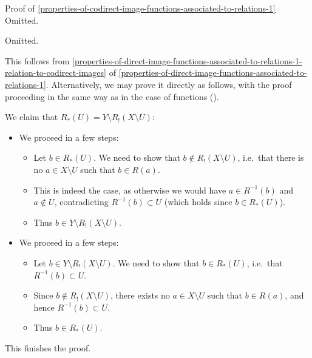 \begin{Proof}{Proof of \cref{properties-of-codirect-image-functions-associated-to-relations-1}}
    Omitted.

    Omitted.

    This follows from \cref{properties-of-direct-image-functions-associated-to-relations-1-relation-to-codirect-images} of \cref{properties-of-direct-image-functions-associated-to-relations-1}. Alternatively, we may prove it directly as follows, with the proof proceeding in the same way as in the case of functions ().

    We claim that $R_{*}(U)=Y\setminus R_{!}(X\setminus U)$:
    \begin{itemize}
        \item{}We proceed in a few steps:
            \begin{itemize}
                \item Let $b\in R_{*}(U)$. We need to show that $b\nin R_{!}(X\setminus U)$, i.e.\ that there is no $a\in X\setminus U$ such that $b\in R(a)$.
                \item This is indeed the case, as otherwise we would have $a\in R^{-1}(b)$ and $a\nin U$, contradicting $R^{-1}(b)\subset U$ (which holds since $b\in R_{*}(U)$).
                \item Thus $b\in Y\setminus R_{!}(X\setminus U)$.
            \end{itemize}
        \item{}We proceed in a few steps:
            \begin{itemize}
                \item Let $b\in Y\setminus R_{!}(X\setminus U)$. We need to show that $b\in R_{*}(U)$, i.e.\ that $R^{-1}(b)\subset U$.
                \item Since $b\nin R_{!}(X\setminus U)$, there exists no $a\in X\setminus U$ such that $b\in R(a)$, and hence $R^{-1}(b)\subset U$.
                \item Thus $b\in R_{*}(U)$.
            \end{itemize}
    \end{itemize}
    This finishes the proof.
\end{Proof}
